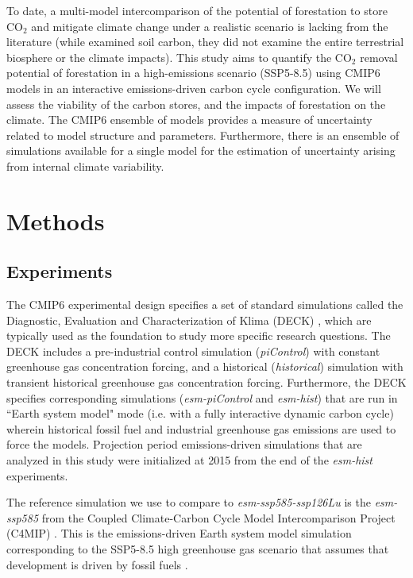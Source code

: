 \documentclass[draft]{agujournal2019}
\begin{document}
To date, a multi-model intercomparison of the potential of forestation to store CO$_2$ and mitigate climate change under a realistic scenario is lacking from the literature (while  examined soil carbon, they did not examine the entire terrestrial biosphere or the climate impacts).
This study aims to quantify the CO$_2$ removal potential of forestation  in a high-emissions scenario (SSP5-8.5) using CMIP6 models in an interactive emissions-driven carbon cycle configuration.
We will assess the viability of the carbon stores, and the  impacts of forestation on the climate.
The CMIP6 ensemble of models provides a measure of uncertainty related to model structure and parameters.
Furthermore, there is an ensemble of simulations available for a single model for the estimation of uncertainty arising from internal climate variability. 

\section{Methods}

\subsection{Experiments}

The CMIP6 experimental design specifies a set of standard simulations called the Diagnostic, Evaluation and Characterization of Klima (DECK) \cite{eyring_overview_2016}, which are typically used as the foundation to study more specific research questions.
The DECK includes a pre-industrial control simulation (\textit{piControl}) with constant greenhouse gas concentration forcing, and a historical (\textit{historical}) simulation with transient historical greenhouse gas concentration forcing.
Furthermore, the DECK specifies corresponding simulations (\textit{esm-piControl} and \textit{esm-hist}) that are run in ``Earth system model" mode (i.e. with a fully interactive dynamic carbon cycle) wherein historical fossil fuel and industrial greenhouse gas emissions are used to force the models.
Projection period emissions-driven simulations that are analyzed in this study were initialized at 2015 from the end of the \textit{esm-hist} experiments.

The reference simulation we use to compare to \textit{esm-ssp585-ssp126Lu} is the \textit{esm-ssp585} from the Coupled Climate-Carbon Cycle Model Intercomparison Project (C4MIP) \cite{jones_c4mip_2016}.
This is the emissions-driven Earth system model simulation corresponding to the SSP5-8.5 high greenhouse gas scenario that assumes that development is driven by fossil fuels \cite{oneill_scenario_2016}.
\end{document}
